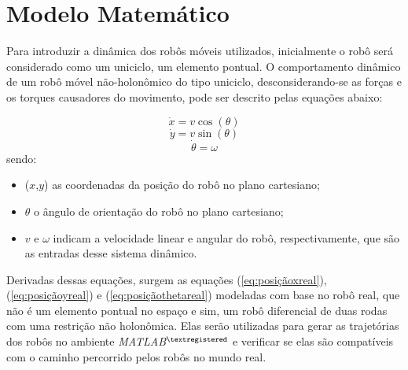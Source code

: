 \section{Modelo Matemático}
\label{sec:modMatematico}
Para introduzir a dinâmica dos robôs móveis utilizados, inicialmente o robô será considerado como um uniciclo, um elemento pontual. O comportamento dinâmico de um robô móvel não-holonômico do tipo uniciclo, desconsiderando-se as forças e os torques causadores do movimento, pode ser descrito pelas equações abaixo:

\begin{equation}
	\dot{x} = v\cos(\theta) 
	\label{eq:posiçãox}
\end{equation}
\begin{equation}
	\dot{y} = v\sin(\theta)
	\label{eq:posiçãoy}
\end{equation}
\begin{equation}
	\dot{\theta} = \omega
	\label{eq:posiçãotheta}
\end{equation}
sendo:
\begin{itemize}
	\item ($x$,$y$) as coordenadas da posição do robô no plano cartesiano;
	\item $\theta$ o ângulo de orientação do robô no plano cartesiano;
	\item $v$ e $\omega$ indicam a velocidade linear e angular do robô, respectivamente, que são as entradas desse sistema dinâmico.	
\end{itemize}

Derivadas dessas equações, surgem as equações (\ref{eq:posiçãoxreal}), (\ref{eq:posiçãoyreal}) e (\ref{eq:posiçãothetareal}) modeladas com base no robô real, que não é um elemento pontual no espaço e sim, um robô diferencial de duas rodas com uma restrição não holonômica. Elas serão utilizadas para gerar as trajetórias dos robôs no ambiente \emph{MATLAB$^{\textregistered}$} e verificar se elas são compatíveis com o caminho percorrido pelos robôs no mundo real. 


